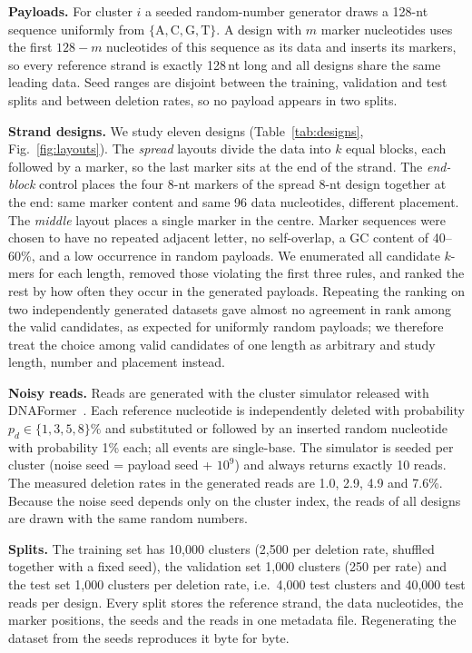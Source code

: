 \textbf{Payloads.} For cluster $i$ a seeded random-number generator draws a 128-nt sequence uniformly from
$\{\mathrm{A,C,G,T}\}$. A design with $m$ marker nucleotides uses the first $128-m$ nucleotides of this sequence as its
data and inserts its markers, so every reference strand is exactly 128\,nt long and all designs share the same leading
data. Seed ranges are disjoint between the training, validation and test splits and between deletion rates, so no
payload appears in two splits.

\textbf{Strand designs.} We study eleven designs (Table~\ref{tab:designs}\ifextended, Fig.~\ref{fig:layouts}\fi). The
\emph{spread} layouts divide the data into $k$ equal blocks, each followed by a marker, so the last marker sits at the
end of the strand. The \emph{end-block} control places the four 8-nt markers of the spread 8-nt design together at the
end: same marker content and same 96 data nucleotides, different placement. The \emph{middle} layout places a single
marker in the centre. Marker sequences were chosen to have no repeated adjacent letter, no self-overlap, a GC content of
40--60\%, and a low occurrence in random payloads.
\ifextended
We enumerated all candidate $k$-mers for each length, removed those violating the first three rules, and ranked the rest
by how often they occur in the generated payloads. Repeating the ranking on two independently generated datasets gave
almost no agreement in rank among the valid candidates, as expected for uniformly random payloads; we therefore treat
the choice among valid candidates of one length as arbitrary and study length, number and placement instead.
\fi

\textbf{Noisy reads.} Reads are generated with the cluster simulator released with DNAFormer~\cite{barlev2025}. Each
reference nucleotide is independently deleted with probability $p_d\in\{1,3,5,8\}\%$ and substituted or followed by an
inserted random nucleotide with probability 1\% each; all events are single-base. The simulator is seeded per cluster
(noise seed = payload seed + $10^{9}$) and always returns exactly 10 reads. The measured deletion rates in the
generated reads are 1.0, 2.9, 4.9 and 7.6\%. Because the noise seed depends only on the cluster index, the reads of all
designs are drawn with the same random numbers.

\textbf{Splits.} The training set has 10{,}000 clusters (2{,}500 per deletion rate, shuffled together with a fixed
seed), the validation set 1{,}000 clusters (250 per rate) and the test set 1{,}000 clusters per deletion rate, i.e.\
4{,}000 test clusters and 40{,}000 test reads per design. Every split stores the reference strand, the data
nucleotides, the marker positions, the seeds and the reads in one metadata file. Regenerating the dataset from the
seeds reproduces it byte for byte.

